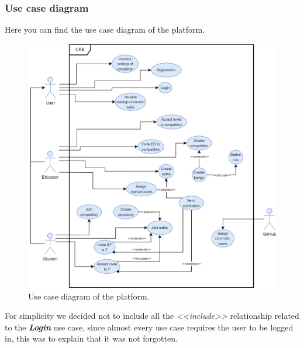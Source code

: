 \subsubsection*{Use case diagram}
Here you can find the use case diagram of the platform. 
\begin{center}
  \begin{figure} [H]
    \begin{center}
        \includegraphics[width=\textwidth,height=\textheight,keepaspectratio]{Images/RASD_UseCaseDiagram.png}
        \caption{Use case diagram of the platform.}
        \label{fig: UseCaseDiagram}
    \end{center}
  \end{figure}
\end{center}

For simplicity we decided not to include all the \textit{<<include>>} relationship related to the \textbf{\textit{Login}} use case, since  almost every use case requires the user to be logged in, this was to explain that it was not forgotten.

